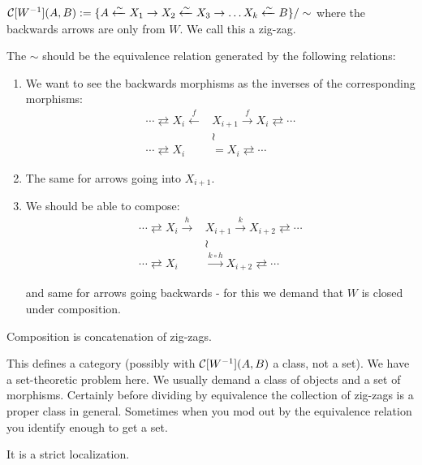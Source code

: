 \documentclass[../MH_Total.tex]{subfiles}
\begin{document}
$\mathcal{C}[W^{-1}](A,B) := \{A \xleftarrow{\sim} X_1 \to X_2 \xleftarrow{\sim} X_3 \to \dots X_k \xleftarrow{\sim} B\}/\sim$ where the backwards arrows are only from $W$. We call this a zig-zag.

The $\sim$ should be the equivalence relation generated by the following relations:
\begin{enumerate}
	\item We want to see the backwards morphisms as the inverses of the corresponding morphisms:
	\begin{align*}
		\cdots \rightleftarrows X_i \xleftarrow{f} &X_{i+1} \xrightarrow{f} X_i \rightleftarrows \cdots\\
		&\wr\\
		\cdots \rightleftarrows X_i &= X_i \rightleftarrows \cdots
	\end{align*}

	\item The same for arrows going into $X_{i+1}$.

	\item We should be able to compose:
	\begin{align*}
	\cdots \rightleftarrows X_i \xrightarrow{h} &X_{i+1} \xrightarrow{k} X_{i+2} \rightleftarrows \cdots\\
	&\wr\\
	\cdots \rightleftarrows X_i &\xrightarrow{k \circ h} X_{i+2} \rightleftarrows \cdots	
	\end{align*}

	and same for arrows going backwards - for this we demand that $W$ is closed under composition.
\end{enumerate}

Composition is concatenation of zig-zags.

\begin{exercise}
	This defines a category (possibly with $\mathcal{C}[W^{-1}](A,B)$ a class, not a set). We have a set-theoretic problem here. We usually demand a class of objects and a set of morphisms. Certainly before dividing by equivalence the collection of zig-zags is a proper class in general. Sometimes when you mod out by the equivalence relation you identify enough to get a set. 
\end{exercise}

\begin{proposition}
	It is a strict localization.
\end{proposition}
\end{document}
